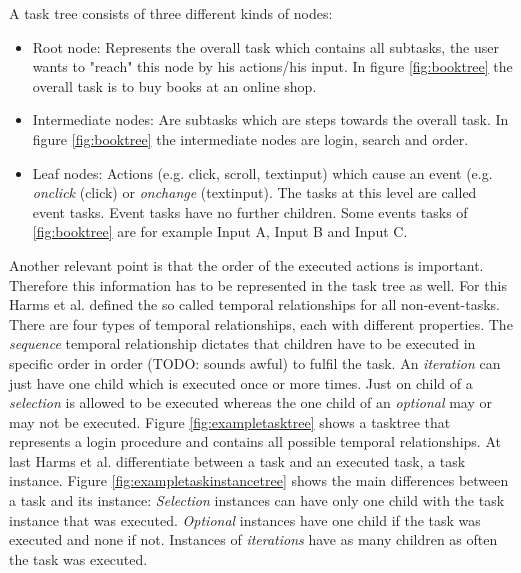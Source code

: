 A task tree consists of three different kinds of nodes:
\begin{itemize} 
	\item Root node: Represents the overall task which contains all subtasks, the user wants to "reach" this node by his actions/his input. 
		In figure \ref{fig:booktree} the overall task is to buy books at an online shop.
	\item Intermediate nodes: Are subtasks which are steps towards the overall task. In figure \ref{fig:booktree} the intermediate nodes are login, search and order.
	\item Leaf nodes: Actions (e.g. click, scroll, textinput) which cause an event (e.g. \textit{onclick} (click) or \textit{onchange} (textinput). The tasks at this level are called event tasks. Event tasks have no further children. Some events tasks of \ref{fig:booktree} are for example Input A, Input B and Input C.
\end{itemize}
Another relevant point is that the order of the executed actions is important. Therefore this information has to be represented in the task tree as well. For this Harms et al. defined the so called temporal relationships for all non-event-tasks. There are four types of temporal relationships, each with different properties. The \textit{sequence} temporal relationship dictates that children have to be executed in specific order in order (TODO: sounds awful) to fulfil the task. An \textit{iteration} can just have one child which is executed once or more times. Just on child of a \textit{selection} is allowed to be executed whereas the one child of an \textit{optional} may or may not be executed. Figure \ref{fig:exampletasktree} shows a tasktree that represents a login procedure and contains all possible temporal relationships. At last Harms et al. differentiate between a task and an executed task, a task instance. Figure \ref{fig:exampletaskinstancetree} shows the main differences between a task and its instance: \textit{Selection} instances can have only one child with the task instance that was executed. \textit{Optional} instances have one child if the task was executed and none if not. Instances of \textit{iterations} have as many children as often the task was executed.
